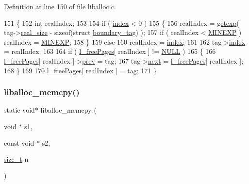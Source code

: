 Definition at line 150 of file liballoc.\+c.


\begin{DoxyCode}
151 \{
152     \textcolor{keywordtype}{int} realIndex;
153     
154     \textcolor{keywordflow}{if} ( \hyperlink{a00095_adfc426eed5361508d62c6e8f484bd270_adfc426eed5361508d62c6e8f484bd270}{index} < 0 ) 
155     \{
156         realIndex = \hyperlink{a00023_ab5fc0b977bf14bdb99c8b87cae451d42_ab5fc0b977bf14bdb99c8b87cae451d42}{getexp}( tag->\hyperlink{a00095_ad22b1c69bdce419783ac165f7f354245_ad22b1c69bdce419783ac165f7f354245}{real\_size} - \textcolor{keyword}{sizeof}(\textcolor{keyword}{struct} 
      \hyperlink{a00095}{boundary\_tag}) );
157         \textcolor{keywordflow}{if} ( realIndex < \hyperlink{a00023_ae7249b0af4d1bfe02a4c7bdbf810bd8c_ae7249b0af4d1bfe02a4c7bdbf810bd8c}{MINEXP} ) realIndex = \hyperlink{a00023_ae7249b0af4d1bfe02a4c7bdbf810bd8c_ae7249b0af4d1bfe02a4c7bdbf810bd8c}{MINEXP};
158     \}
159     \textcolor{keywordflow}{else}
160         realIndex = \hyperlink{a00095_adfc426eed5361508d62c6e8f484bd270_adfc426eed5361508d62c6e8f484bd270}{index};
161     
162     tag->\hyperlink{a00095_adfc426eed5361508d62c6e8f484bd270_adfc426eed5361508d62c6e8f484bd270}{index} = realIndex;
163     
164     \textcolor{keywordflow}{if} ( \hyperlink{a00023_a78b8b6e448179d3cd64915f99fee60e0_a78b8b6e448179d3cd64915f99fee60e0}{l\_freePages}[ realIndex ] != \hyperlink{a00026_a070d2ce7b6bb7e5c05602aa8c308d0c4_a070d2ce7b6bb7e5c05602aa8c308d0c4}{NULL} ) 
165     \{
166         \hyperlink{a00023_a78b8b6e448179d3cd64915f99fee60e0_a78b8b6e448179d3cd64915f99fee60e0}{l\_freePages}[ realIndex ]->\hyperlink{a00095_af5e6f310850e847ad873773f9ab8b902_af5e6f310850e847ad873773f9ab8b902}{prev} = tag;
167         tag->\hyperlink{a00095_a123f0bd815d7fda9f535b031640662fc_a123f0bd815d7fda9f535b031640662fc}{next} = \hyperlink{a00023_a78b8b6e448179d3cd64915f99fee60e0_a78b8b6e448179d3cd64915f99fee60e0}{l\_freePages}[ realIndex ];
168     \}
169 
170     \hyperlink{a00023_a78b8b6e448179d3cd64915f99fee60e0_a78b8b6e448179d3cd64915f99fee60e0}{l\_freePages}[ realIndex ] = tag;
171 \}
\end{DoxyCode}
\mbox{\label{a00023_a58b3101a659b6a2f7e2ca290bef6bfb4_a58b3101a659b6a2f7e2ca290bef6bfb4}} 
\subsubsection{\texorpdfstring{liballoc\+\_\+memcpy()}{liballoc\_memcpy()}}
{\footnotesize\ttfamily static void$\ast$ liballoc\+\_\+memcpy (\begin{DoxyParamCaption}\item[{void $\ast$}]{s1,  }\item[{const void $\ast$}]{s2,  }\item[{\hyperlink{a00026_a7c94ea6f8948649f8d181ae55911eeaf_a7c94ea6f8948649f8d181ae55911eeaf}{size\+\_\+t}}]{n }\end{DoxyParamCaption})\hspace{0.3cm}{\ttfamily [static]}}



